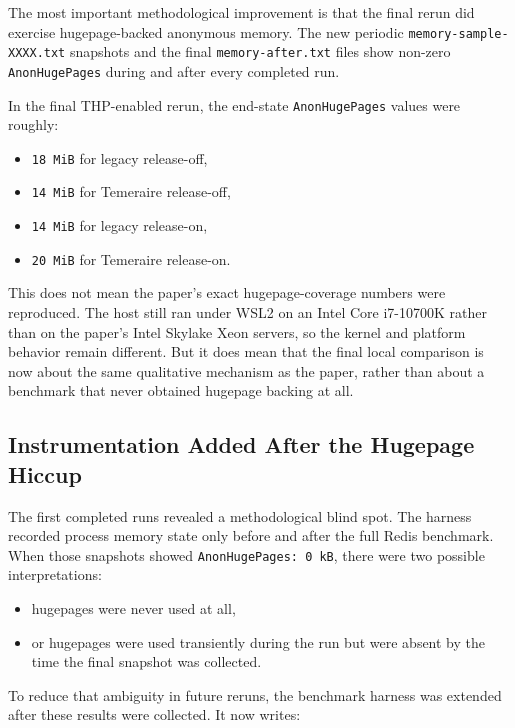 \documentclass[a4paper,11pt]{article}
\begin{document}
The most important methodological improvement is that the final rerun did
exercise hugepage-backed anonymous memory. The new periodic
\texttt{memory-sample-XXXX.txt} snapshots and the final
\texttt{memory-after.txt} files show non-zero \texttt{AnonHugePages} during and
after every completed run.

In the final THP-enabled rerun, the end-state \texttt{AnonHugePages} values
were roughly:

\begin{itemize}[leftmargin=1.5em]
  \item \texttt{18 MiB} for legacy release-off,
  \item \texttt{14 MiB} for Temeraire release-off,
  \item \texttt{14 MiB} for legacy release-on,
  \item \texttt{20 MiB} for Temeraire release-on.
\end{itemize}

This does not mean the paper's exact hugepage-coverage numbers were reproduced.
The host still ran under WSL2 on an Intel Core i7-10700K rather than on the
paper's Intel Skylake Xeon servers, so the kernel and platform behavior remain
different. But it does mean that the final local comparison is now about the
same qualitative mechanism as the paper, rather than about a benchmark that
never obtained hugepage backing at all.

\subsection{Instrumentation Added After the Hugepage Hiccup}

The first completed runs revealed a methodological blind spot. The harness
recorded process memory state only before and after the full Redis benchmark.
When those snapshots showed \texttt{AnonHugePages: 0 kB}, there were two
possible interpretations:

\begin{itemize}[leftmargin=1.5em]
  \item hugepages were never used at all,
  \item or hugepages were used transiently during the run but were absent by
  the time the final snapshot was collected.
\end{itemize}

To reduce that ambiguity in future reruns, the benchmark harness was extended
after these results were collected. It now writes:
\end{document}
